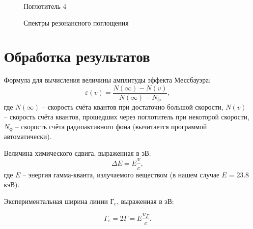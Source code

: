 \documentclass[a4paper,12pt]{article} %
\begin{document}
\begin{figure}[h!]
\begin{minipage}[h!]{0.55\linewidth}
\end{minipage}
\hfill
\begin{minipage}[h!]{0.55\linewidth}
 Поглотитель 4 \\
\end{minipage}
\caption{Спектры резонансного поглощения}
\label{graphs}
\end{figure}

\section{Обработка результатов}

Формула для вычисления величины амплитуды эффекта Мессбауэра:
$$
\varepsilon(v) = \frac{N(\infty) - N(v)}{N(\infty) - N_\text{ф}},
$$
\noindent где $N(\infty)$ -- скорость счёта квантов при достаточно большой скорости, $N(v)$ -- скорость счёта квантов, прошедших через поглотитель при некоторой скорости, $N_\text{ф}$ -- скорость счёта радиоактивного фона (вычитается программой автоматически).

\noindent Величина химического сдвига, выраженная в эВ:
$$
\Delta E = E \frac{v}{c},
$$
\noindent где $E$ -- энергия гамма-кванта, излучаемого веществом (в нашем случае $E$ = 23.8 кэВ).

\noindent Экспериментальная ширина линии Г$_e$, выраженная в эВ:

$$
\Gamma_e = 2 \Gamma = E \frac{v_\Gamma}{c}.
$$
\end{document}
